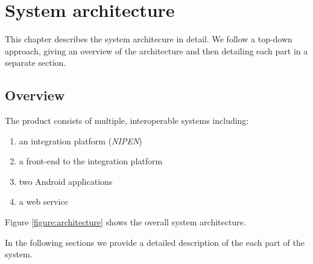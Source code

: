 \chapter{System architecture}
\label{ch:architecture}


This chapter describes the system architecure in detail.
We follow a top-down approach, giving an overview of the architecture and then detailing each part in a separate section.

\section{Overview}

The product consists of multiple, interoperable systems including:%
\begin{enumerate}[1.]
	\item an integration platform (\textit{NIPEN})
	\item a front-end to the integration platform
	\item two Android applications
	\item a web service%
\end{enumerate}

Figure \ref{figure:architecture} shows the overall system architecture.

In the following sections we provide a detailed description of the each part of the system.

